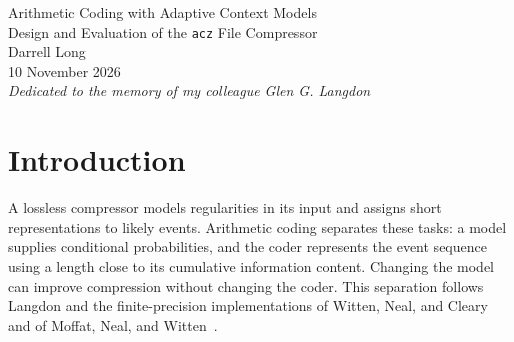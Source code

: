 \documentclass[10pt,letterpaper]{article}
\newcommand{\acz}{\texttt{acz}}
\newcommand{\code}[1]{\texttt{#1}}
\begin{document}
\begin{center}
\vspace*{1em}
{\Large Arithmetic Coding with Adaptive Context Models}\\[5pt]
{\large Design and Evaluation of the \acz{} File Compressor}\\[14pt]
Darrell Long\\[5pt]
10 November 2026\\[7pt]
\textit{Dedicated to the memory of my colleague Glen G. Langdon}
\end{center}
\begin{abstract}
The \acz{} file compressor combines finite-precision arithmetic coding with adaptive byte models, prediction by partial matching (PPM), and context mixing. Its order-six PPM keeps contexts in a trie stored in two arrays, uses binary escape estimates and information inheritance based on Shkarin's published methods, and codes events with a byte-normalized multi-symbol range coder. The context mixer combines local statistics, bit histories, long matches, and record contexts in integer arithmetic. Its logistic tables are computed from the function's definition, and it finds record lengths with a sequential test on predictive code lengths. Independent blocks permit parallel coding, while optional repeat removal carries information across block boundaries. On the twelve-file Silesia corpus, with one worker per program, context mixing produces \CmMB{} MB from \InputMB{} MB of input, \CmSmallerXz\% less than \code{xz -9}, in \CmEncode{} seconds of encoding and \CmDecode{} seconds of decoding. On held-out samples of U.S. Census Bureau data (\CensusGB{}~GB) and Backblaze hard drive statistics (\BackblazeGB{}~GB), it produces \CensusCM\% and \BackblazeCM\% of input, against \CensusXz\% and \BackblazeXz\% for \mbox{\code{xz -9}}. PPM produces \PpmMB{} MB and takes \PpmEncode{} seconds to encode and \PpmDecode{} seconds to decode. Against the earlier trie model and coder in a balanced experiment, its model and coder reduce bytes by 3.46\% and encoding CPU time by 10.69\%; its output is \PpmPortLarger\% larger than that of the PPMd-H port in release 0.5.0.
\end{abstract}

\section{Introduction}
A lossless compressor models regularities in its input and assigns short representations to likely events. Arithmetic coding separates these tasks: a model supplies conditional probabilities, and the coder represents the event sequence using a length close to its cumulative information content. Changing the model can improve compression without changing the coder. This separation follows Langdon and the finite-precision implementations of Witten, Neal, and Cleary and of Moffat, Neal, and Witten~\cite{langdon,witten,moffat}.
\end{document}
